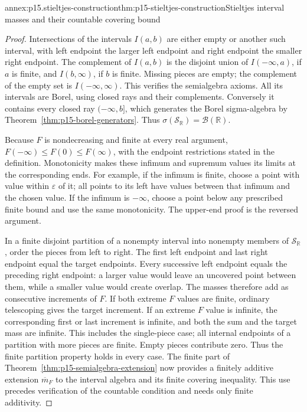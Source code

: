 \begin{annexitem}{annex:p15.stieltjes-construction}{thm:p15-stieltjes-construction}{Stieltjes interval masses and their countable covering bound}
\begin{proof}
Intersections of the intervals \(I(a,b)\) are either empty or another
such interval, with left endpoint the larger left endpoint and right
endpoint the smaller right endpoint. The complement of \(I(a,b)\)
is the disjoint union of \(I(-\infty,a)\), if \(a\) is finite,
and \(I(b,\infty)\), if \(b\) is finite. Missing pieces are empty;
the complement of the empty set is \(I(-\infty,\infty)\).
This verifies the semialgebra axioms. All its intervals are Borel,
using closed rays and their complements. Conversely it contains every
closed ray \((-\infty,b]\), which generates the Borel sigma-algebra
by Theorem~\ref{thm:p15-borel-generators}. Thus
\(\sigma(\mathcal S_{\mathbb R})=\mathcal B(\mathbb R)\).

Because \(F\) is nondecreasing and finite at every real argument,
\(F(-\infty)\leq F(0)\leq F(\infty)\), with the endpoint
restrictions stated in the definition. Monotonicity makes these infimum
and supremum values its limits at the corresponding ends. For example,
if the infimum is finite, choose a point with value within
\(\varepsilon\) of it; all points to its left have values between
that infimum and the chosen value. If the infimum is \(-\infty\),
choose a point below any prescribed finite bound and use the same
monotonicity. The upper-end proof is the reversed argument.

In a finite disjoint partition of a nonempty interval into nonempty
members of \(\mathcal S_{\mathbb R}\), order the pieces from left
to right. The first left endpoint and last right endpoint equal the
target endpoints. Every successive left endpoint equals the preceding
right endpoint: a larger value would leave an uncovered point between
them, while a smaller value would create overlap. The masses therefore
add as consecutive increments of \(F\). If both extreme \(F\)
values are finite, ordinary telescoping gives the target increment.
If an extreme \(F\) value is infinite, the corresponding first or
last increment is infinite, and both the sum and the target mass are
infinite. This includes the single-piece case; all internal endpoints
of a partition with more pieces are finite. Empty pieces contribute
zero. Thus the finite partition property holds in every case.
The finite part of Theorem~\ref{thm:p15-semialgebra-extension} now
provides a finitely additive extension \(\overline m_F\) to the
interval algebra and its finite covering inequality. This use precedes
verification of the countable condition and needs only finite additivity.


\end{proof}
\end{annexitem}
